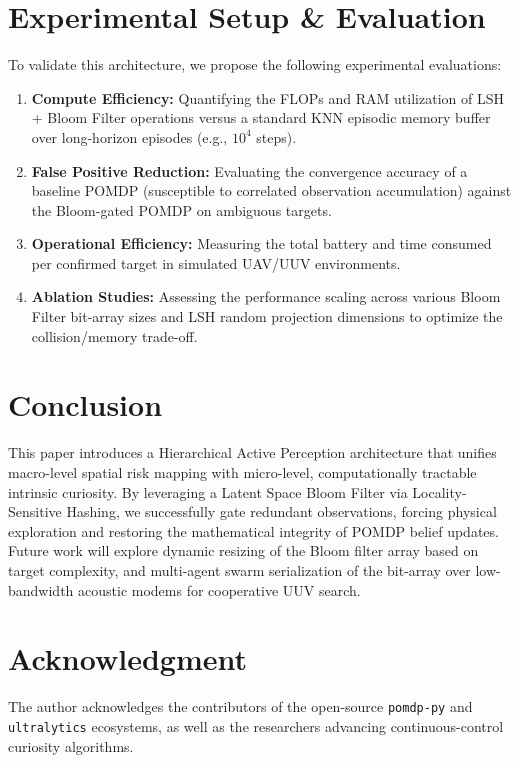 \documentclass[conference]{IEEEtran}
\begin{document}
\section{Experimental Setup \& Evaluation}
To validate this architecture, we propose the following experimental evaluations:
\begin{enumerate}
    \item \textbf{Compute Efficiency:} Quantifying the FLOPs and RAM utilization of LSH + Bloom Filter operations versus a standard KNN episodic memory buffer over long-horizon episodes (e.g., $10^4$ steps).
    \item \textbf{False Positive Reduction:} Evaluating the convergence accuracy of a baseline POMDP (susceptible to correlated observation accumulation) against the Bloom-gated POMDP on ambiguous targets.
    \item \textbf{Operational Efficiency:} Measuring the total battery and time consumed per confirmed target in simulated UAV/UUV environments.
    \item \textbf{Ablation Studies:} Assessing the performance scaling across various Bloom Filter bit-array sizes and LSH random projection dimensions to optimize the collision/memory trade-off.
\end{enumerate}

\section{Conclusion}
This paper introduces a Hierarchical Active Perception architecture that unifies macro-level spatial risk mapping with micro-level, computationally tractable intrinsic curiosity. By leveraging a Latent Space Bloom Filter via Locality-Sensitive Hashing, we successfully gate redundant observations, forcing physical exploration and restoring the mathematical integrity of POMDP belief updates. Future work will explore dynamic resizing of the Bloom filter array based on target complexity, and multi-agent swarm serialization of the bit-array over low-bandwidth acoustic modems for cooperative UUV search.

\section*{Acknowledgment}
The author acknowledges the contributors of the open-source \texttt{pomdp-py} and \texttt{ultralytics} ecosystems, as well as the researchers advancing continuous-control curiosity algorithms.
\end{document}
